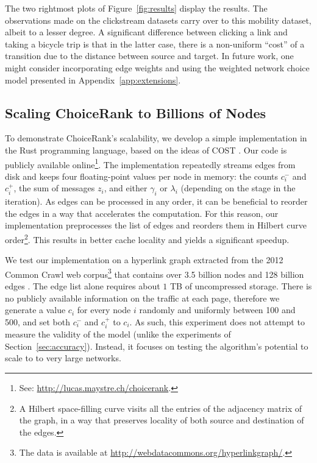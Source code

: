 The two rightmost plots of Figure~\ref{fig:results} display the results.
The observations made on the clickstream datasets carry over to this mobility dataset, albeit to a lesser degree.
A significant difference between clicking a link and taking a bicycle trip is that in the latter case, there is a non-uniform ``cost'' of a transition due to the distance between source and target.
In future work, one might consider incorporating edge weights and using the weighted network choice model presented in Appendix~\ref{app:extensions}.


\subsection{Scaling ChoiceRank to Billions of Nodes}

To demonstrate ChoiceRank's scalability, we develop a simple implementation in the Rust programming language, based on the ideas of COST \citep{mcsherry2015scalability}.
Our code is publicly available online\footnote{See: \url{http://lucas.maystre.ch/choicerank}.}.
The implementation repeatedly streams edges from disk and keeps four floating-point values per node in memory:
the counts $c^-_i$ and $c^+_i$, the sum of messages $z_i$, and either $\gamma_i$ or $\lambda_i$ (depending on the stage in the iteration).
As edges can be processed in any order, it can be beneficial to reorder the edges in a way that accelerates the computation.
For this reason, our implementation preprocesses the list of edges and reorders them in Hilbert curve order\footnote{A Hilbert space-filling curve visits all the entries of the adjacency matrix of the graph, in a way that preserves locality of both source and destination of the edges.}.
This results in better cache locality and yields a significant speedup.

We test our implementation on a hyperlink graph extracted from the 2012 Common Crawl web corpus\footnote{
The data is available at \url{http://webdatacommons.org/hyperlinkgraph/}.} that contains over \num{3.5} billion nodes and \num{128} billion edges \citep{meusel2014graph}.
The edge list alone requires about $1$ TB of uncompressed storage.
There is no publicly available information on the traffic at each page, therefore we generate a value $c_i$ for every node $i$ randomly and uniformly between \num{100} and \num{500}, and set both $c^-_i$ and $c^+_i$ to $c_i$.
As such, this experiment does not attempt to measure the validity of the model (unlike the experiments of Section~\ref{sec:accuracy}).
Instead, it focuses on testing the algorithm's potential to scale to to very large networks.

